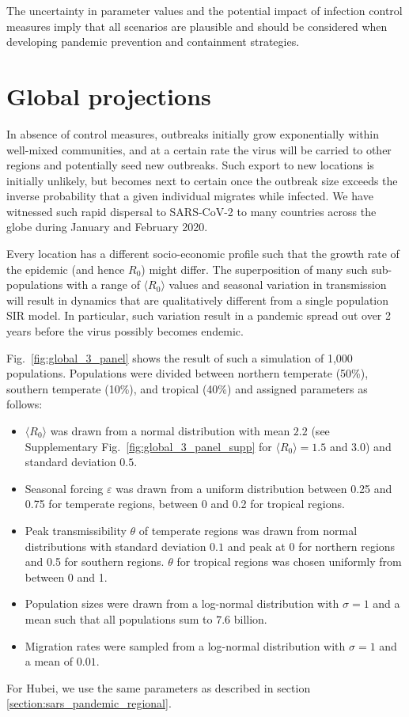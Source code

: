 \documentclass[rmp, reprint, superscriptaddress, floatfix,amsmath]{revtex4-1}
\newcommand{\forcing}{\varepsilon}
\begin{document}
The uncertainty in parameter values and the potential impact of infection control measures imply that all scenarios are plausible and should be considered when developing pandemic prevention and containment strategies.


\section{Global projections}
In absence of control measures, outbreaks initially grow exponentially within well-mixed communities, and at a certain rate the virus will be carried to other regions and potentially seed new outbreaks. 
Such export to new locations is initially unlikely, but becomes next to certain once the outbreak size exceeds the inverse probability that a given individual migrates while infected.
We have witnessed such rapid dispersal to SARS-CoV-2 to many countries across the globe during January and February 2020.

Every location has a different socio-economic profile such that the growth rate of the epidemic (and hence $R_0$) might differ. 
The superposition of many such sub-populations with a range of $\langle R_0 \rangle$ values and seasonal variation in transmission will result in dynamics that are qualitatively different from a single population SIR model. 
In particular, such variation result in a pandemic spread out over 2 years before the virus possibly becomes endemic. 

Fig.~\ref{fig:global_3_panel} shows the result of such a simulation of 1,000 populations.
Populations were divided between northern temperate (50\%), southern temperate (10\%), and tropical (40\%) and assigned parameters as follows:
\begin{itemize}
    \item $\langle R_0 \rangle$ was drawn from a normal distribution with mean $2.2$ (see Supplementary Fig.~\ref{fig:global_3_panel_supp} for $\langle R_0 \rangle=1.5$ and 3.0) and standard deviation $0.5$.
    \item Seasonal forcing $\forcing$ was drawn from a uniform distribution between 0.25 and 0.75 for temperate regions, between 0 and 0.2 for tropical regions.
    \item Peak transmissibility $\theta$ of temperate regions was drawn from normal distributions with standard deviation $0.1$ and peak at $0$ for northern regions and 0.5 for southern regions. $\theta$ for tropical regions was chosen uniformly from between 0 and 1.  
    \item Population sizes were drawn from a log-normal distribution with $\sigma=1$ and a mean such that all populations sum to $7.6$ billion.
    \item Migration rates were sampled from a log-normal distribution with $\sigma=1$ and a mean of $0.01$.
\end{itemize}
For Hubei, we use the same parameters as described in section \ref{section:sars_pandemic_regional}.
\end{document}
